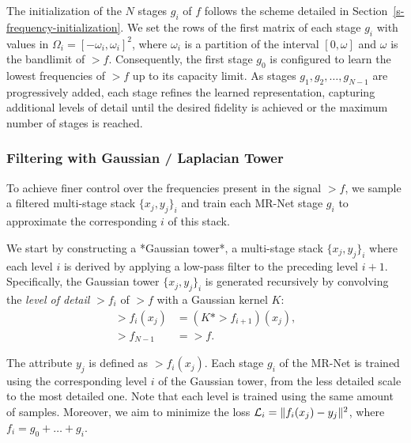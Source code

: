 
The initialization of the $N$ stages $g_i$ of $f$ follows the scheme detailed in Section~\ref{s-frequency-initialization}. We set the rows of the first matrix of each stage $g_i$ with values in $\Omega_i=[-\omega_i, \omega_i]^2$, where $\omega_i$ is a partition of the interval $[0,\omega]$ and $\omega$ is the bandlimit of $\gt{f}$. Consequently, the first stage $g_0$ is configured to learn the lowest frequencies of $\gt{f}$ up to its capacity limit. As stages $g_1, g_2, \ldots, g_{N-1}$ are progressively added, each stage refines the learned representation, capturing additional levels of detail until the desired fidelity is achieved or the maximum number of stages is reached.


\subsubsection{Filtering with Gaussian / Laplacian Tower}

To achieve finer control over the frequencies present in the signal $\gt{f}$, we sample a filtered multi-stage stack $\{x_j, y_j\}_i$ and train each MR-Net stage $g_i$ to approximate the corresponding $i$ of this stack.

We start by constructing a *Gaussian tower*, a multi-stage stack $\{x_j, y_j\}_i$ where each level $i$ is derived by applying a low-pass filter to the preceding level $i+1$. Specifically, the Gaussian tower $\{x_j, y_j\}_i$ is generated recursively by convolving the \textit{level of detail} $\gt{f}_i$ of $\gt{f}$ with a Gaussian kernel $K$:
\begin{align*}
    \gt{f}_i(x_j) &= \left(K * \gt{f}_{i+1}\right)(x_j), \\
    \gt{f}_{N-1} &= \gt{f}.
\end{align*}

The attribute $y_j$ is defined as $\gt{f}_i(x_j)$. 
Each stage $g_i$ of the MR-Net is trained using the corresponding level $i$ of the Gaussian tower, from the less detailed scale to the most detailed one. Note that each level is trained using the same amount of samples. Moreover, we aim to minimize the loss $\mathcal{L}_i = \lVert f_i(x_j)-y_j\rVert^2$, where $f_i = g_0 + \dots + g_{i}$.

